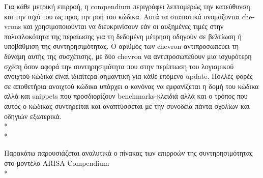 \documentclass[a4paper, 11pt]{article}
\begin{document}
{{ Για κάθε
μετρική επιρροή, η \textlatin{compendium} περιγράφει λεπτομερώς την κατεύθυνση και την ισχύ του ως προς την ροή του κώδικα. Αυτά τα στατιστικά ονομάζονται \textlatin{chevrons} και χρησιμοποιούνται
να διευκρινίσουν εάν οι αυξημένες τιμές στην πολυπλοκότητα της περαίωσης για τη δεδομένη μέτρηση οδηγούν σε βελτίωση ή
υποβάθμιση της συντηρησιμότητας. Ο αριθμός των \textlatin{chevron} αντιπροσωπεύει τη δύναμη
αυτής της συσχέτισης, με δύο chevron να αντιπροσωπεύουν μια ισχυρότερη σχέση όσον αφορά την συντηρησιμότητα που στην περίπτωση του λογισμικού ανοιχτού κώδικα είναι ιδιαίτερα σημαντική για κάθε επόμενο \textlatin{update}. Πολλές φορές σε αποθετήρια ανοιχτού κώδικα υπάρχει ο κανόνας να εμφανίζεται η δομή του κώδικα αλλά και \textlatin{snippets} που προσδιορίζουν benchmarks-κλειδιά αλλά και ο τρόπος που αυτός ο κώδικας συντηρείται και αναπτύσσεται με την συνοδεία πάντα σχολίων και οδηγιών εξωτερικά. \\*
\\*



Παρακάτω παρουσιάζεται αναλυτικά ο πίνακας των επιρροών της συντηρησιμότητας στο μοντέλο ARISA Compendium\\*

}}
\end{document}

